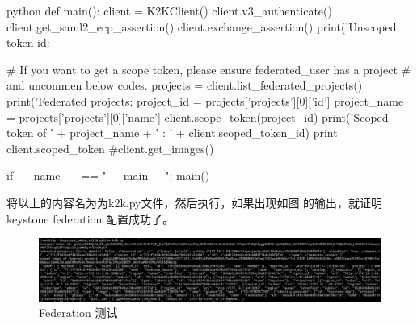\begin{code-block}{python}
def main():
    client = K2KClient()
    client.v3_authenticate()
    client.get_saml2_ecp_assertion()
    client.exchange_assertion()
    print('Unscoped token id: %

    # If you want to get a scope token, please ensure federated_user has a project
    # and uncommen below codes.
    projects = client.list_federated_projects()
    print('Federated projects: %
    project_id = projects['projects'][0]['id']
    project_name = projects['projects'][0]['name']
    client.scope_token(project_id)
    print('Scoped token of ' + project_name + ' : ' + client.scoped_token_id)
    print client.scoped_token
    #client.get_images()


if __name__ == "__main__":
    main()
\end{code-block}

将以上的内容名为为k2k.py文件，然后执行，如果出现如图 的输出，就证明keystone federation
配置成功了。
\begin{figure}[H]
  \centering
  \includegraphics[width=\linewidth]{k2k_result.png}
  \caption{Federation 测试}
  \label{fig:k2k_result}
\end{figure}

